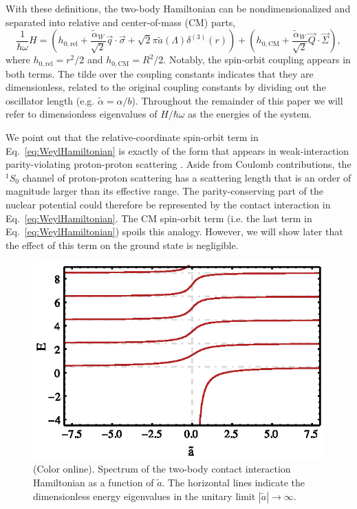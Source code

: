 \documentclass[%
 notitlepage,
 preprint,
showpacs,%
 amsmath,amssymb,
 aps,
pra,
]{revtex4-1}
\begin{document}
With these definitions, the two-body Hamiltonian can be nondimensionalized and separated into relative and center-of-mass (CM) parts,
\begin{equation}\label{eq:WeylHamiltonian}
\frac{1}{\hbar\omega}H=\left(h_{0,\text{rel}}+\frac{\tilde{\alpha}_W}{\sqrt{2}} \vec{q}\cdot\vec{\sigma} + \sqrt{2}\pi \tilde{a}(\Lambda) \delta^{(3)}(r)\right)+\left(h_{0,\text{CM}}+\frac{\tilde{\alpha}_W}{\sqrt{2}} \vec{Q}\cdot\vec{\Sigma} \right),
\end{equation}
where $h_{0,\text{rel}}=r^2/2$ and $h_{0,\text{CM}}=R^2/2$. Notably, the spin-orbit coupling appears in both terms.  The tilde over the coupling constants indicates that they are dimensionless, related to the original coupling constants by dividing out the oscillator length (e.g. $\tilde{\alpha}=\alpha/b$). Throughout the remainder of this paper we will refer to dimensionless eigenvalues of $H/\hbar\omega$ as the energies of the system.

We point out that the relative-coordinate spin-orbit term in Eq.~\eqref{eq:WeylHamiltonian} is exactly of the form that appears in weak-interaction parity-violating proton-proton scattering \cite{Haxton:2013aca,deVries:2014vqa}.  Aside from Coulomb contributions, the $^1S_0$ channel of proton-proton scattering has a scattering length that is an order of magnitude larger than its effective range.  The parity-conserving part of the nuclear potential could therefore be represented by the contact interaction in Eq.~\eqref{eq:WeylHamiltonian}.  The CM spin-orbit term (i.e. the last term in Eq.~\eqref{eq:WeylHamiltonian}) spoils this analogy. However, we will show later that the effect of this term on the ground state is negligible. 

\begin{figure}
\includegraphics{Figures/BuschSpectrum}
\caption{\label{fig:BuschSpectrum}(Color online). Spectrum of the two-body contact interaction Hamiltonian as a function of $\tilde a$. The horizontal lines indicate the dimensionless energy eigenvalues in the unitary limit $|\tilde{a}|\rightarrow\infty$.} 
\end{figure}
\end{document}
